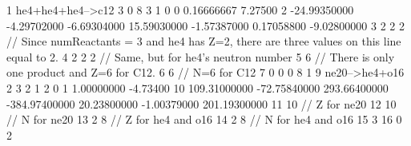 \begin{DoxyCode}
1 he4+he4+he4-->c12 3 0 8 3 1 0 0 0.16666667 7.27500
2 -24.99350000 -4.29702000 -6.69304000 15.59030000 -1.57387000 0.17058800 -9.02800000
3 2 2 2 // Since numReactants = 3 and he4 has Z=2, there are three values on this line equal to 2.
4 2 2 2 // Same, but for he4's neutron number
5 6 // There is only one product and Z=6 for C12.
6 6 // N=6 for C12
7 0 0 0 
8 1 
9 ne20-->he4+o16 2 3 2 1 2 0 1 1.00000000 -4.73400
10 109.31000000 -72.75840000 293.66400000 -384.97400000 20.23800000 -1.00379000 201.19300000
11 10 // Z for ne20
12 10 // N for ne20
13 2 8 // Z for he4 and o16
14 2 8 // N for he4 and o16
15 3 
16 0 2 
\end{DoxyCode}
 